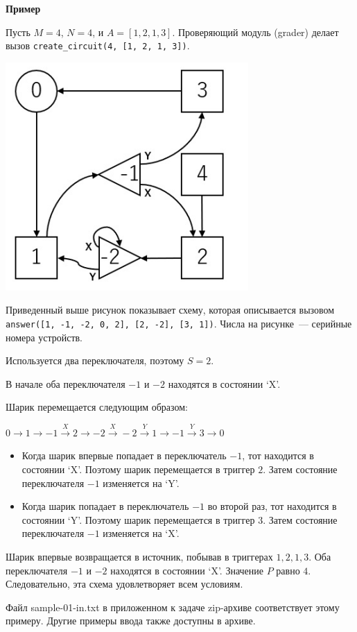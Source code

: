 \textbf{Пример}

Пусть $M=4$, $N=4$, и $A=[1,2,1,3]$. Проверяющий модуль (grader) делает вызов \texttt{create\_circuit(4, [1, 2, 1,
3])}.

\includegraphics{4.png}

Приведенный выше рисунок показывает схему, которая описывается вызовом \texttt{answer([1, -1, -2, 0,
2], [2, -2], [3, 1])}.  Числа на рисунке~--- серийные
номера устройств. 

Используется два переключателя, поэтому $S=2$.

В начале оба переключателя $-1$ и $-2$ находятся в состоянии `X'. 

Шарик перемещается
следующим образом:

$0\rightarrow 1 \rightarrow -1 \stackrel{X}\rightarrow 2 \rightarrow -2 \stackrel{X}\rightarrow -2 \stackrel{Y}\rightarrow 1 \rightarrow -1 \stackrel{Y}\rightarrow 3 \rightarrow 0$ 

\begin{itemize}
    \item Когда шарик впервые попадает в переключатель $-1$, тот находится в
состоянии `X'. Поэтому шарик перемещается в триггер $2$. Затем состояние
переключателя $-1$ изменяется на `Y'.
\item Когда шарик попадает в переключатель $-1$ во второй раз, тот находится в
состоянии `Y'. Поэтому шарик перемещается в триггер $3$. Затем состояние
переключателя $-1$ изменяется на `X'.
\end{itemize}

Шарик впервые возвращается в источник, побывав в триггерах $1,2,1,3$. Оба
переключателя $-1$ и $-2$ находятся в состоянии `X'. Значение $P$ равно $4$.
Следовательно, эта схема удовлетворяет всем условиям.

Файл sample-01-in.txt в приложенном к задаче zip-архиве соответствует этому
примеру. Другие примеры ввода также доступны в архиве.

